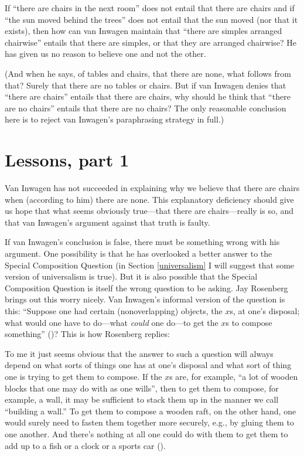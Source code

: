 \documentclass[11pt]{article}
\newenvironment{squote}{%
\begin{spacing}{1}
\begin{list}{}{%
    \setlength{\labelwidth}{0pt}%
    \rightmargin\leftmargin%
  }
\item\relax
}{%
\end{list}%
\end{spacing}
}
\begin{document}
\begin{spacing}{1.5}
If ``there are chairs in the next room'' does not entail that there
are chairs and if ``the sun moved behind the trees'' does not entail
that the sun moved (nor that it exists), then how can van Inwagen
maintain that ``there are simples arranged chairwise'' entails that
there are simples, or that they are arranged chairwise?  He has given
us no reason to believe one and not the other.

(And when he says, of tables and chairs, that there are none, what
follows from that?  Surely that there are no tables or chairs.  But if
van Inwagen denies that ``there are chairs'' entails that there are
chairs, why should he think that ``there are no chairs'' entails that
there are no chairs?  The only reasonable conclusion here is to reject
van Inwagen's paraphrasing strategy in full.)

\section{Lessons, part 1}
\label{lessons-v}
Van Inwagen has not succeeded in explaining why we believe that there
are chairs when (according to him) there are none.  This explanatory
deficiency should give us hope that what seems obviously true---that
there are chairs---really is so, and that van Inwagen's argument
against that truth is faulty.

If van Inwagen's conclusion is false, there must be something wrong
with his argument.  One possibility is that he has overlooked a better
answer to the Special Composition Question (in Section
\ref{universalism} I will suggest that some version of universalism is
true).  But it is also possible that the Special Composition Question
is itself the wrong question to be asking.  Jay Rosenberg brings out
this worry nicely.  Van Inwagen's informal version of the question is
this: ``Suppose one had certain (nonoverlapping) objects, the $x$s, at
one's disposal; what would one have to do---what {\em could} one
do---to get the $x$s to compose something''
(\citeyear[31]{inwagen1995})?  This is how Rosenberg replies:

\begin{squote}
To me it just seems obvious that the answer to such a question will
always depend on what sorts of things one has at one's disposal and
what sort of thing one is trying to get them to compose.  If the $x$s
are, for example, ``a lot of wooden blocks that one may do with as one
wills'', then to get them to compose, for example, a wall, it may be
sufficient to stack them up in the manner we call ``building a wall.''
To get them to compose a wooden raft, on the other hand, one would
surely need to fasten them together more securely, e.g., by gluing
them to one another.  And there's nothing at all one could do with
them to get them to add up to a fish or a clock or a sports car
(\citeyear[705]{rosenberg1993}).
\end{squote}


\end{spacing}
\end{document}
